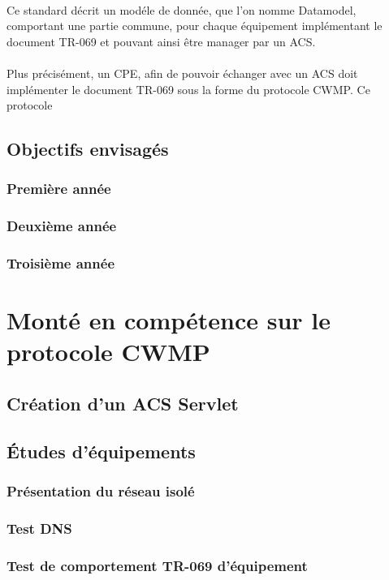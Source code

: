 \documentclass[12pt,a4paper]{report}
\begin{document}
\paragraph*{} Ce standard décrit un modéle de donnée, que l'on nomme Datamodel, comportant une partie commune, pour chaque équipement implémentant le document TR-069 et pouvant ainsi être manager par un ACS.
\paragraph*{} Plus précisément, un CPE, afin de pouvoir échanger avec un ACS doit implémenter le document TR-069 sous la forme du protocole CWMP. Ce protocole 

\subsection{Objectifs envisagés}
\subsubsection{Première année}
\subsubsection{Deuxième année}
\subsubsection{Troisième année}

\newpage
\section{Monté en compétence sur le protocole CWMP}
\subsection{Création d'un ACS Servlet}
\subsection{Études d'équipements}
\subsubsection{Présentation du réseau isolé}
\subsubsection{Test DNS}
\subsubsection{Test de comportement TR-069 d'équipement}
\end{document}
